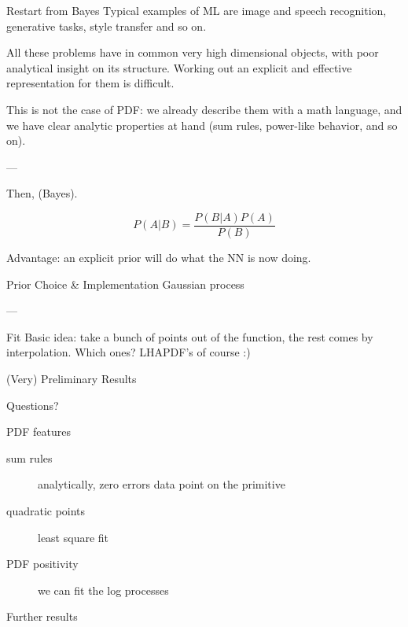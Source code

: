 \documentclass[9pt]{beamer}
\begin{document}
\begin{frame}{Restart from Bayes}
    Typical examples of ML are image and speech recognition, generative tasks,
    style transfer and so on.

    All these problems have in common very high dimensional objects, with poor
    analytical insight on its structure. Working out an explicit and effective
    representation for them is difficult.

    This is not the case of PDF: we already describe them with a math language,
    and we have clear analytic properties at hand (sum rules, power-like
    behavior, and so on).
    
    ---

    Then, (Bayes).

    \begin{equation*}
        P(A|B) = \frac{P(B|A) P(A)}{P(B)}
    \end{equation*}
    
    Advantage: an explicit prior will do what the NN is now doing.
\end{frame}

\begin{frame}{Prior Choice \& Implementation}
    Gaussian process
    
    ---

    Fit Basic idea: take a bunch of points out of the function, the rest comes
    by interpolation. Which ones? LHAPDF's of course :)
\end{frame}


\begin{frame}{(Very) Preliminary Results}
\end{frame}

\begin{frame}[standout]
    Questions?
\end{frame}

\appendix

\begin{frame}{PDF features}
    \begin{description}
        \item[sum rules] analytically, zero errors data point on the primitive
        \item[quadratic points] least square fit
        \item[PDF positivity] we can fit the log processes
    \end{description}
\end{frame}

\begin{frame}{Further results}
\end{frame}
\end{document}
